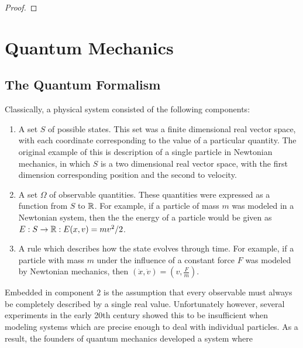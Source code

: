 \documentclass[a4paper]{article}
\begin{document}
\begin{proof}
    
\end{proof}


\section{Quantum Mechanics}
\subsection{The Quantum Formalism}
Classically, a physical system consisted of the following components: 
\begin{enumerate}
    \item A set $S$ of possible states. This set was a finite dimensional real vector space, with each coordinate corresponding to the value of a particular quantity. The original example of this is description of a single particle in Newtonian mechanics, in which $S$ is a two dimensional real vector space, with the first dimension corresponding position and the second to velocity.
    \item A set $\Omega$ of observable quantities. These quantities were expressed as a function from $S$ to $\mathbb{R}$. For example, if a particle of mass $m$ was modeled in a Newtonian system, then the the energy of a particle would be given as $E: S \to \mathbb{R} : E(x, v) = mv^2/2$.
    \item A rule which describes how the state evolves through time. For example, if a particle with mass $m$ under the influence of a constant force $F$ was modeled by Newtonian mechanics, then $(\dot{x}, \dot{v}) = (v, \frac{F}{m})$.
\end{enumerate}
Embedded in component $2$ is the assumption that every observable must always be completely described by a single real value. Unfortunately however, several experiments in the early 20th century showed this to be insufficient when modeling systems which are precise enough to deal with individual particles. As a result, the founders of quantum mechanics developed a system where
\end{document}
